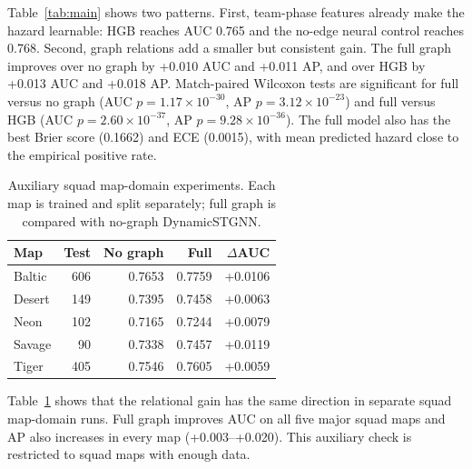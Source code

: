 Table~\ref{tab:main} shows two patterns. First, team-phase features already
make the hazard learnable: HGB reaches AUC 0.765 and the no-edge neural
control reaches 0.768. Second, graph relations add a smaller but consistent
gain. The full graph improves over no graph by +0.010 AUC and +0.011 AP, and
over HGB by +0.013 AUC and +0.018 AP. Match-paired Wilcoxon tests are
significant for full versus no graph (AUC \(p=1.17\times10^{-30}\), AP
\(p=3.12\times10^{-23}\)) and full versus HGB (AUC
\(p=2.60\times10^{-37}\), AP \(p=9.28\times10^{-36}\)). The full model also
has the best Brier score (0.1662) and ECE (0.0015), with mean predicted
hazard close to the empirical positive rate.

\begin{table}[htbp]
\centering
\caption{Auxiliary squad map-domain experiments. Each map is trained and split
separately; full graph is compared with no-graph DynamicSTGNN.}
\label{tab:map-domain}
\small
\begin{tabular}{lrrrr}
\toprule
Map & Test & No graph & Full & \(\Delta\)AUC \\
\midrule
Baltic & 606 & 0.7653 & 0.7759 & +0.0106 \\
Desert & 149 & 0.7395 & 0.7458 & +0.0063 \\
Neon & 102 & 0.7165 & 0.7244 & +0.0079 \\
Savage & 90 & 0.7338 & 0.7457 & +0.0119 \\
Tiger & 405 & 0.7546 & 0.7605 & +0.0059 \\
\bottomrule
\end{tabular}
\end{table}

Table~\ref{tab:map-domain} shows that the relational gain has the same
direction in separate squad map-domain runs. Full graph improves AUC on all
five major squad maps and AP also increases in every map (+0.003--+0.020).
This auxiliary check is restricted to squad maps with enough data.

